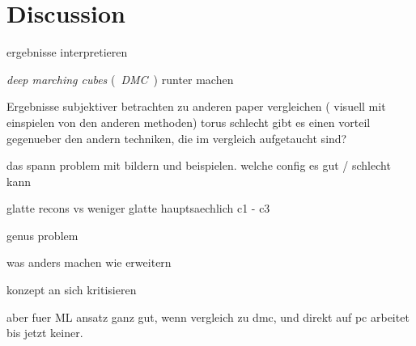 \chapter{Discussion}
\label{sec:dicussion}
ergebnisse interpretieren

\emph{deep marching cubes} (~\emph{DMC}~) runter machen

Ergebnisse subjektiver betrachten
zu anderen paper vergleichen ( visuell mit einspielen von den anderen methoden)
torus schlecht
gibt es einen vorteil gegenueber den andern techniken, die im vergleich aufgetaucht sind?

das spann problem mit bildern und beispielen. welche config es gut / schlecht kann

glatte recons vs weniger glatte hauptsaechlich c1 - c3

genus problem

was anders machen
wie erweitern

konzept an sich kritisieren

aber fuer ML ansatz ganz gut, wenn vergleich zu dmc, und 
direkt auf pc arbeitet bis jetzt keiner.